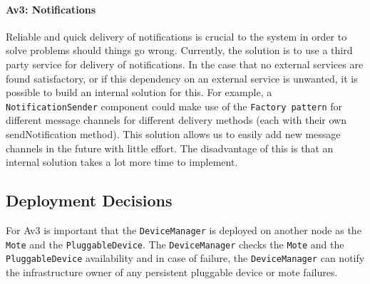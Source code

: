         \paragraph{Av3: Notifications}
            Reliable and quick delivery of notifications is crucial to the
            system in order to solve problems should things go wrong. Currently,
            the solution is to use a third party service for delivery of
            notifications. In the case that no external services are found
            satisfactory, or if this dependency on an external service is
            unwanted, it is possible to build an internal solution for this.
            For example, a \texttt{NotificationSender} component could make use
            of the \texttt{Factory pattern} for different message channels for
            different delivery methods (each with their own sendNotification method).
            This solution allows us to easily add new message channels in the
            future with little effort. The disadvantage of this is that an
            internal solution takes a lot more time to implement.


    \subsection*{Deployment Decisions}
        For Av3 is important that the \texttt{DeviceManager} is deployed on another node as the
        \texttt{Mote} and the \texttt{PluggableDevice}. The \texttt{DeviceManager}
        checks the \texttt{Mote} and the \texttt{PluggableDevice} availability and in case of failure, the \texttt{DeviceManager}
        can notify the infrastructure owner of any persistent pluggable device or mote failures.\\
